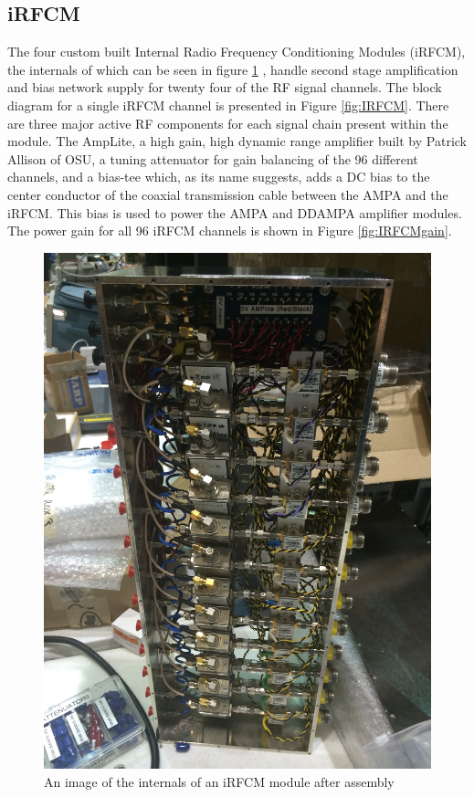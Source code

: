 	\subsection{iRFCM}
	The four custom built Internal Radio Frequency Conditioning Modules (iRFCM), the internals of which can be seen in figure \ref{fig:IRFCMpic} , handle second stage amplification and bias network supply for twenty four of the RF signal channels.  The block diagram for a single iRFCM channel is presented in Figure \ref{fig:IRFCM}.  There are three major active RF components for each signal chain present within the module. The AmpLite, a high gain, high dynamic range amplifier built by Patrick Allison of OSU, a tuning attenuator for gain balancing of the 96 different channels, and a bias-tee which, as its name suggests, adds a DC bias to the center conductor of the coaxial transmission cable between the AMPA and the iRFCM.  This bias is used to power the AMPA and DDAMPA amplifier modules.  The power gain for all 96 iRFCM channels is shown in Figure \ref{fig:IRFCMgain}.

\begin{figure}
\centering
	\includegraphics[height=0.9\textheight]{figures/IRFCMpic}
	\caption{An image of the internals of an iRFCM module after assembly}
	\label{fig:IRFCMpic}
\end{figure}

